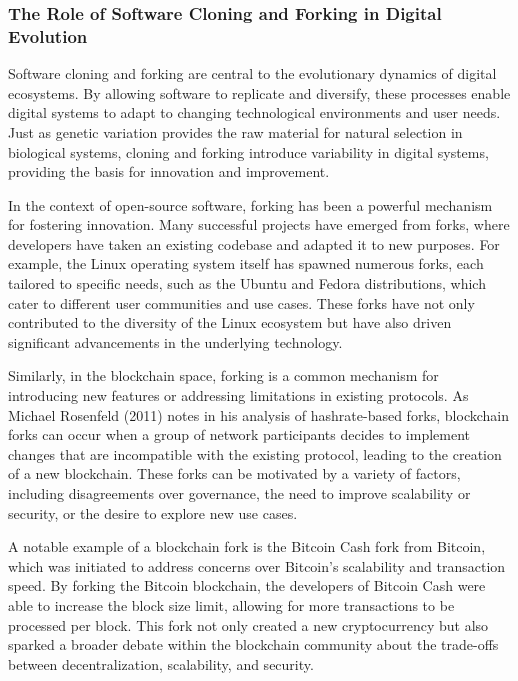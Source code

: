 \documentclass[12pt,twoside]{article}
\begin{document}
\subsubsection{The Role of Software Cloning and Forking in Digital Evolution}

Software cloning and forking are central to the evolutionary dynamics of digital ecosystems. By allowing software to replicate and diversify, these processes enable digital systems to adapt to changing technological environments and user needs. Just as genetic variation provides the raw material for natural selection in biological systems, cloning and forking introduce variability in digital systems, providing the basis for innovation and improvement.

In the context of open-source software, forking has been a powerful mechanism for fostering innovation. Many successful projects have emerged from forks, where developers have taken an existing codebase and adapted it to new purposes. For example, the Linux operating system itself has spawned numerous forks, each tailored to specific needs, such as the Ubuntu and Fedora distributions, which cater to different user communities and use cases. These forks have not only contributed to the diversity of the Linux ecosystem but have also driven significant advancements in the underlying technology.

Similarly, in the blockchain space, forking is a common mechanism for introducing new features or addressing limitations in existing protocols. As Michael Rosenfeld (2011) notes in his analysis of hashrate-based forks, blockchain forks can occur when a group of network participants decides to implement changes that are incompatible with the existing protocol, leading to the creation of a new blockchain. These forks can be motivated by a variety of factors, including disagreements over governance, the need to improve scalability or security, or the desire to explore new use cases.

A notable example of a blockchain fork is the Bitcoin Cash fork from Bitcoin, which was initiated to address concerns over Bitcoin's scalability and transaction speed. By forking the Bitcoin blockchain, the developers of Bitcoin Cash were able to increase the block size limit, allowing for more transactions to be processed per block. This fork not only created a new cryptocurrency but also sparked a broader debate within the blockchain community about the trade-offs between decentralization, scalability, and security.
\end{document}
